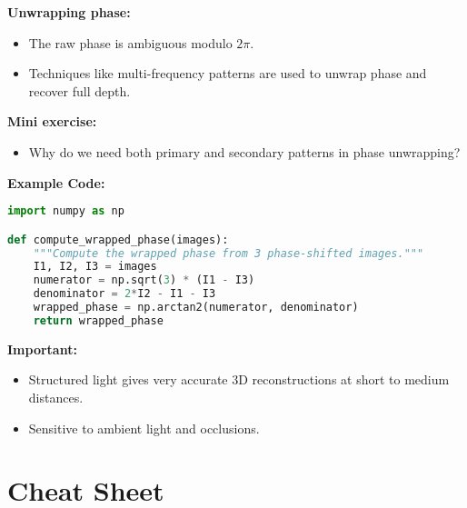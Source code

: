 \documentclass[a4paper,11pt]{article}
\begin{document}
\textbf{Unwrapping phase:}
\begin{itemize}
    \item The raw phase is ambiguous modulo $2\pi$.
    \item Techniques like multi-frequency patterns are used to unwrap phase and recover full depth.
\end{itemize}

\textbf{Mini exercise:}
\begin{itemize}
    \item Why do we need both primary and secondary patterns in phase unwrapping?
\end{itemize}

\vspace{1em}

\textbf{Example Code:}
\begin{lstlisting}[language=Python]
import numpy as np

def compute_wrapped_phase(images):
    """Compute the wrapped phase from 3 phase-shifted images."""
    I1, I2, I3 = images
    numerator = np.sqrt(3) * (I1 - I3)
    denominator = 2*I2 - I1 - I3
    wrapped_phase = np.arctan2(numerator, denominator)
    return wrapped_phase
\end{lstlisting}

\vspace{1em}

\textbf{Important:}
\begin{itemize}
    \item Structured light gives very accurate 3D reconstructions at short to medium distances.
    \item Sensitive to ambient light and occlusions.
\end{itemize}

\newpage
\section{Cheat Sheet}
\end{document}
